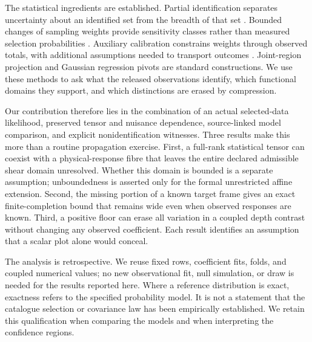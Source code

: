 The statistical ingredients are established. Partial identification separates uncertainty about an identified set from the breadth of that set \cite{ImbensManski2004}. Bounded changes of sampling weights provide sensitivity classes rather than measured selection probabilities \cite{AronowLee2013}. Auxiliary calibration constrains weights through observed totals, with additional assumptions needed to transport outcomes \cite{Deville1992}. Joint-region projection and Gaussian regression pivots are standard constructions. We use these methods to ask what the released observations identify, which functional domains they support, and which distinctions are erased by compression.

Our contribution therefore lies in the combination of an actual selected-data likelihood, preserved tensor and nuisance dependence, source-linked model comparison, and explicit nonidentification witnesses. Three results make this more than a routine propagation exercise. First, a full-rank statistical tensor can coexist with a physical-response fibre that leaves the entire declared admissible shear domain unresolved. Whether this domain is bounded is a separate assumption; unboundedness is asserted only for the formal unrestricted affine extension. Second, the missing portion of a known target frame gives an exact finite-completion bound that remains wide even when observed responses are known. Third, a positive floor can erase all variation in a coupled depth contrast without changing any observed coefficient. Each result identifies an assumption that a scalar plot alone would conceal.

The analysis is retrospective. We reuse fixed rows, coefficient fits, folds, and coupled numerical values; no new observational fit, null simulation, or draw is needed for the results reported here. Where a reference distribution is exact, exactness refers to the specified probability model. It is not a statement that the catalogue selection or covariance law has been empirically established. We retain this qualification when comparing the models and when interpreting the confidence regions.

